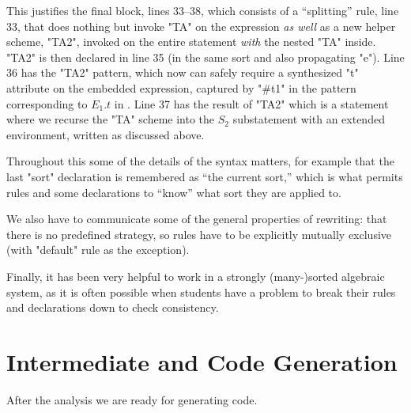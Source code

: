 \documentclass[11pt]{article} %
\begin{document}
\begin{enumerate}
    This justifies the final block, lines 33--38, which consists of a ``splitting'' rule, line 33,
    that does nothing but invoke "TA" on the expression \emph{as well} as a new helper scheme,
    "TA2", invoked on the entire statement \emph{with} the nested "TA" inside.  "TA2" is then
    declared in line 35 (in the same sort and also propagating "e"). Line 36 has the "TA2" pattern,
    which now can safely require a synthesized "t" attribute on the embedded expression, captured by
    "#t1" in the pattern corresponding to $E_1.t$ in . Line 37 has the result of "TA2"
    which is a statement where we recurse the "TA" scheme into the $S_2$ substatement with an
    extended environment, written as discussed above.

  \end{enumerate}

Throughout this some of the details of the \HAX syntax matters, for example that the last "sort"
declaration is remembered as ``the current sort,'' which is what permits rules and some declarations
to ``know'' what sort they are applied to.

We also have to communicate some of the general properties of rewriting: that there is no predefined
strategy, so rules have to be explicitly mutually exclusive (with "default" rule as the exception).

Finally, it has been very helpful to work in a strongly (many-)sorted algebraic system, as it is
often possible when students have a problem to break their rules and declarations down to check
consistency.




\section{Intermediate and Code Generation}
\label{sec:cg}

After the analysis we are ready for generating code.
\end{document}
